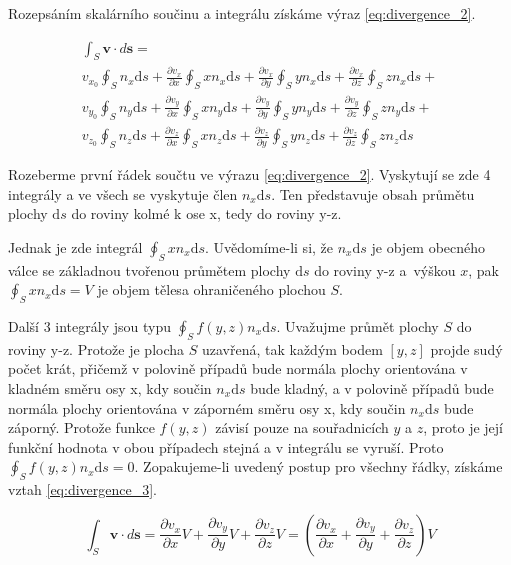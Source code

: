 \documentclass{book}
\newcommand{\vect}[1]{\boldsymbol{#1}}
\begin{document}
Rozepsáním skalárního součinu a integrálu získáme výraz \eqref{eq:divergence_2}.

\begin{equation}
\label{eq:divergence_2}
\begin{matrix}
\int_S \vect{v} \cdot d\vect{s} = \\
v_{x_0} \oint_S n_x \mathrm{d}s + \frac{\partial v_x}{\partial x} \oint_S x n_x \mathrm{d}s + \frac{\partial v_x}{\partial y} \oint_S y n_x \mathrm{d}s + \frac{\partial v_x}{\partial z} \oint_S z n_x \mathrm{d}s + \\
v_{y_0} \oint_S n_y \mathrm{d}s + \frac{\partial v_y}{\partial x} \oint_S x n_y \mathrm{d}s + \frac{\partial v_y}{\partial y} \oint_S y n_y \mathrm{d}s + \frac{\partial v_y}{\partial z} \oint_S z n_y \mathrm{d}s + \\
v_{z_0} \oint_S n_z \mathrm{d}s + \frac{\partial v_z}{\partial x} \oint_S x n_z \mathrm{d}s + \frac{\partial v_z}{\partial y} \oint_S y n_z \mathrm{d}s + \frac{\partial v_z}{\partial z} \oint_S z n_z \mathrm{d}s
\end{matrix}
\end{equation}

Rozeberme první řádek součtu ve výrazu \eqref{eq:divergence_2}. Vyskytují se zde 4 integrály a ve všech se vyskytuje člen \(n_x \mathrm{d}s\). Ten představuje obsah průmětu plochy \(\mathrm{d}s\) do roviny kolmé k ose x, tedy do roviny y-z.

Jednak je zde integrál \(\oint_S x n_x \mathrm{d}s\). Uvědomíme-li si, že \(n_x \mathrm{d}s\) je objem obecného válce se základnou tvořenou průmětem plochy \(\mathrm{d}s\) do roviny y-z a~výškou \(x\), pak \(\oint_S x n_x \mathrm{d}s = V\) je objem tělesa ohraničeného plochou \(S\).

Další 3 integrály jsou typu \(\oint_S f(y, z) n_x \mathrm{d}s\). Uvažujme průmět plochy \(S\) do roviny y-z. Protože je plocha \(S\) uzavřená, tak každým bodem \([y, z]\) projde sudý počet krát, přičemž v polovině případů bude normála plochy orientována v kladném směru osy x, kdy součin \(n_x \mathrm{d}s\) bude kladný, a v polovině případů bude normála plochy orientována v záporném směru osy x, kdy součin \(n_x \mathrm{d}s\) bude záporný. Protože funkce \(f(y, z)\) závisí pouze na souřadnicích \(y\) a \(z\), proto je její funkční hodnota v obou případech stejná a v integrálu se vyruší. Proto \(\oint_S f(y, z) n_x \mathrm{d}s = 0\). Zopakujeme-li uvedený postup pro všechny řádky, získáme vztah \eqref{eq:divergence_3}.

\begin{equation}
\label{eq:divergence_3}
\int_S \vect{v} \cdot d\vect{s} = \frac{\partial v_x}{\partial x} V + \frac{\partial v_y}{\partial y} V + \frac{\partial v_z}{\partial z} V = \left(\frac{\partial v_x}{\partial x} + \frac{\partial v_y}{\partial y} + \frac{\partial v_z}{\partial z}\right) V
\end{equation}
\end{document}
